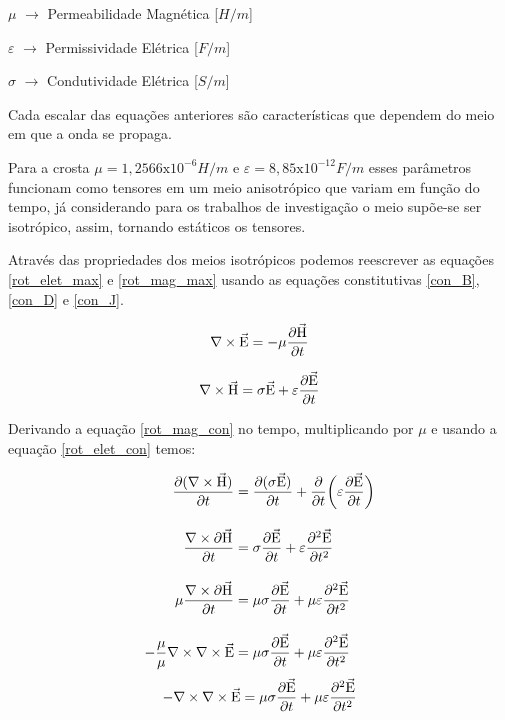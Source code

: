            $\mu$ $\rightarrow$ Permeabilidade Magnética [$H/m$]
	    
            $\varepsilon$ $\rightarrow$ Permissividade Elétrica [$F/m$]
	    
            $\sigma$ $\rightarrow$ Condutividade Elétrica [$S/m$]
	    
            Cada escalar das equações anteriores são características que dependem do meio em que a onda se propaga.
	    
            Para a crosta $\mu = 1,2566\textrm{x}10^{-6} H/m$ e $\varepsilon = 8,85
            \textrm{x}10^{-12} F/m$ esses parâmetros funcionam como tensores em um meio
            anisotrópico que variam em função do tempo, já considerando para os 
            trabalhos de investigação o meio supõe-se ser isotrópico, assim, 
            tornando estáticos os tensores.
	
            Através das propriedades dos meios isotrópicos podemos reescrever as equações \ref{rot_elet_max} e \ref{rot_mag_max} usando as equações constitutivas \ref{con_B}, \ref{con_D} e \ref{con_J}.
            
            \begin{equation}
                \label{rot_elet_con}
                \nabla \times \vec{\textrm{E}} = - \mu \dfrac{\partial \vec{\textrm{H}}}{\partial t}
            \end{equation}
            
            \begin{equation}
                \label{rot_mag_con}
                \nabla \times \vec{\textrm{H}} = \sigma \vec{\textrm{E}} + \varepsilon \dfrac{\partial \vec{\textrm{E}}}{\partial t}
            \end{equation}
            
            Derivando a equação \ref{rot_mag_con} no tempo, multiplicando por $\mu$ e usando a equação \ref{rot_elet_con} temos:
            
            
\begin{align*}
\dfrac{\partial (\nabla \times \vec{\textrm{H}})}{\partial t} & = \dfrac{\partial (\sigma \vec{\textrm{E}})}{\partial t} + \dfrac{\partial}{\partial t} \bigg(\varepsilon \dfrac{\partial \vec{\textrm{E}}}{\partial t}\bigg)\\[10pt]
             \dfrac{\nabla \times \partial \vec{\textrm{H}}}{\partial t} & = \sigma \dfrac{\partial \vec{\textrm{E}}}{\partial t} + \varepsilon \dfrac{\partial^2 \vec{\textrm{E}}}{\partial t^2} \\[10pt]
             \mu \dfrac{\nabla \times \partial \vec{\textrm{H}}}{\partial t} & = \mu \sigma \dfrac{\partial \vec{\textrm{E}}}{\partial t} + \mu \varepsilon \dfrac{\partial^2 \vec{\textrm{E}}}{\partial t^2} \\[10pt]
             -\dfrac{\mu}{\mu} \nabla \times \nabla \times \vec{\textrm{E}} & = \mu \sigma \dfrac{\partial \vec{\textrm{E}}}{\partial t} + \mu \varepsilon \dfrac{\partial^2 \vec{\textrm{E}}}{\partial t^2}
             \end{align*}
             \begin{equation}
                \label{menos_rot_e}
              - \nabla \times \nabla \times \vec{\textrm{E}} = \mu \sigma \dfrac{\partial \vec{\textrm{E}}}{\partial t} + \mu \varepsilon \dfrac{\partial^2 \vec{\textrm{E}}}{\partial t^2}
             \end{equation}
                
